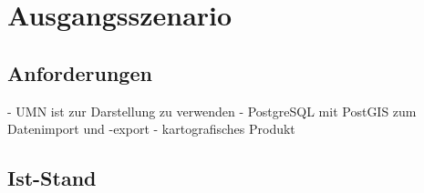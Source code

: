 \chapter{Ausgangsszenario}

\section{Anforderungen}

- UMN ist zur Darstellung zu verwenden
- PostgreSQL mit PostGIS zum Datenimport und -export
- kartografisches Produkt

\section{Ist-Stand}

